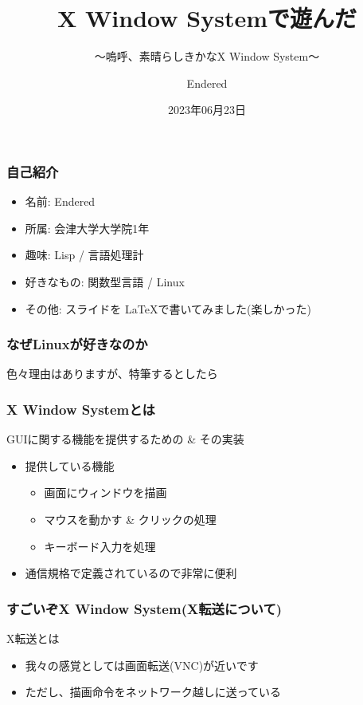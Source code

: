 \documentclass{beamer}
\begin{document}
\title{X Window Systemで遊んだ}
\subtitle{〜嗚呼、素晴らしきかなX Window System〜}
\author{Endered}
\date{2023年06月23日}

\begin{frame}
  \titlepage
\end{frame}


\begin{frame}
  \frametitle{自己紹介}
  \begin{itemize}
  \item 名前: Endered
  \item 所属: 会津大学大学院1年
  \item 趣味: Lisp / 言語処理計
  \item 好きなもの: 関数型言語 / \alert<2>{Linux} 
  \item その他: スライドを \LaTeX で書いてみました(楽しかった)
  \end{itemize}
\end{frame}

\begin{frame}[c]{}
  \frametitle{なぜLinuxが好きなのか}
  \centering
  色々理由はありますが、特筆するとしたら

\end{frame}

\begin{frame}
  \frametitle{X Window Systemとは}
  GUIに関する機能を提供するための \& その実装
  \begin{itemize}
  \item 提供している機能
    \begin{itemize}
    \item 画面にウィンドウを描画
    \item マウスを動かす \& クリックの処理
    \item キーボード入力を処理
    \end{itemize}
  \item<2> 通信規格で定義されているので非常に便利
  \end{itemize}
\end{frame}

\begin{frame}
  \frametitle{すごいぞX Window System(X転送について)}
  X転送とは
  \begin{itemize}
  \item 我々の感覚としては画面転送(VNC)が近いです
  \item ただし、描画命令をネットワーク越しに送っている
  \end{itemize}
\end{frame}
\end{document}
